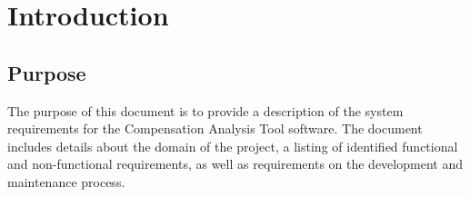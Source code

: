 \documentclass[english]{article}
\begin{document}
\vspace*{\fill}
{
\vspace*{\fill}

\newpage

\tableofcontents

\newpage

\setcounter{page}{1}
}


\color{black}
\section{Introduction}
\label{sec:introduction}

\subsection{Purpose}
\label{sub:purpose}
The purpose of this document is to provide a description of the system requirements for the Compensation Analysis Tool software.  The document includes details about the domain of the project, a listing of identified functional and non-functional requirements, as well as requirements on the development and maintenance process.
\end{document}
